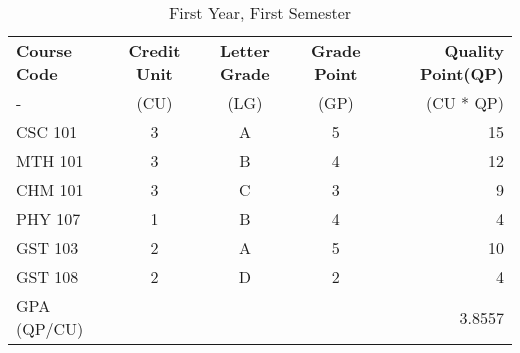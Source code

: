\documentclass{article}
\begin{document}
	\begin{table}[h!]
		\begin{center}
			\caption{First Year, First Semester}
			\label{tab: table1}
			\begin{tabular}{l|c|c|c|r|}
				\textbf{Course Code} & \textbf{Credit Unit} &
				\textbf{Letter Grade} & \textbf{Grade Point} & \textbf{Quality Point(QP)}\\
				- & (CU) & (LG) & (GP) & (CU * QP) \\
				\hline
				CSC 101 & 3 & A & 5 & 15\\
				MTH 101 & 3 & B & 4 & 12\\
				CHM 101 & 3 & C & 3 & 9\\
				PHY 107 & 1 & B & 4 & 4\\
				GST 103 & 2 & A & 5 & 10\\
				GST 108 & 2 & D & 2 & 4\\
				GPA (QP/CU) &  &  &  & 3.8557\\
				\end{tabular}
			\end{center}
			\end{table}
			
\end{document}
